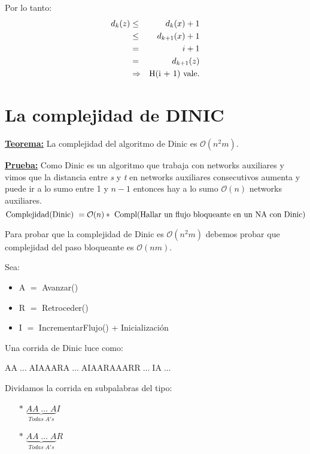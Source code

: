\documentclass[12pt,a4paper]{report}
\begin{document}
\begin{enumerate}
				\par Por lo tanto:
				\begin{eqnarray}
					\nonumber d_{k}(z) &\leq & d_{k}(x) + 1 \\
					\nonumber &\leq & d_{k + 1}(x) + 1 \\
					\nonumber &=& i + 1 \\
					\nonumber &=& d_{k + 1}(z) \\
					\nonumber & \Rightarrow & \textup{H(i + 1) vale.}
				\end{eqnarray}
			\end{enumerate}


	\section{La complejidad de DINIC}
		\textbf{\underline{Teorema:}} La complejidad del algoritmo de Dinic es $\mathcal{O}(n^{2}m)$.

		\textbf{\underline{Prueba:}} Como Dinic es un algoritmo que trabaja con networks auxiliares y vimos que la distancia entre \textit{s} y \textit{t} en networks auxiliares consecutivos aumenta y puede ir a lo sumo entre 1 y $n - 1$ entonces hay a lo sumo $\mathcal{O}(n)$ networks auxiliares.
			\[ \textup{Complejidad(Dinic) } = \mathcal{O}(n) * \textup{ Compl(Hallar un flujo bloqueante en un NA con Dinic)} \]
			\par Para probar que la complejidad de Dinic es $\mathcal{O}(n^{2}m)$ debemos probar que complejidad del paso bloqueante es $\mathcal{O}(nm)$.
			\par Sea:
			\begin{itemize}
				\item A $=$ Avanzar()
				\item R $=$ Retroceder()
				\item I $=$ IncrementarFlujo() + Inicialización
			\end{itemize}

			\par Una corrida de Dinic luce como:
			\begin{center}
				AA$\; \dotsc \;$AIAAARA$\; \dotsc \;$AIAARAAARR$\; \dotsc \;$IA$\; \dotsc \;$
			\end{center}

			\par Dividamos la corrida en subpalabras del tipo:
			\begin{center}
				\begin{itemize}
					\item[$*$] $\underbrace{AA \; \dotsc \; A}_{Todas \; A's}I$
					\item[$*$] $\underbrace{AA \; \dotsc \; A}_{Todas \; A's}R$
				\end{itemize}
			\end{center}
\end{document}
